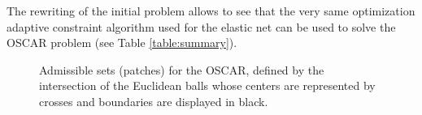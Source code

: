 



The rewriting of the initial problem  allows to see that the very same
optimization adaptive  constraint algorithm  used for the  elastic net
can be used to solve the OSCAR problem (see Table \ref{table:summary}).


\begin{figure}
  \begin{center} 
    \caption{Admissible sets (patches) for the OSCAR, defined by the
      intersection of the Euclidean balls whose centers are represented by
      crosses and boundaries are
      displayed in black.}
    \label{fig:oscar-penalty}
    \end{center} 
\end{figure}

